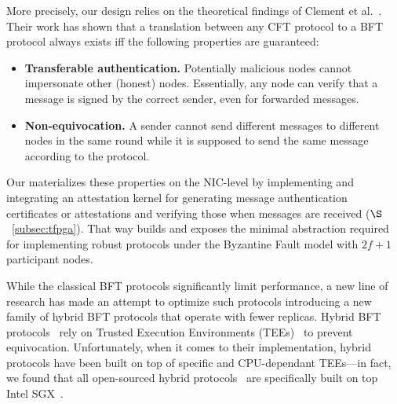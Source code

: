 More precisely, our design relies on the theoretical findings of Clement et al.~\cite{clement2012}. Their work has shown that a translation between any CFT protocol to a BFT protocol always exists iff the following properties are guaranteed:
\begin{itemize}
    \item {\bf{Transferable authentication.}} Potentially malicious nodes cannot impersonate other (honest) nodes. Essentially, any node can verify that a message is signed by the correct sender, even for forwarded messages.
    \item {\bf{Non-equivocation.}} A sender cannot send different messages to different nodes in the same round while it is supposed to send the same message according to the protocol.
\end{itemize}

Our \projecttitle{} materializes these properties on the NIC-level by implementing and integrating an attestation kernel for generating message authentication certificates or attestations and verifying those when messages are received ($\S$~\ref{subsec:tfpga}). That way \projecttitle{} builds and exposes the minimal abstraction required for implementing robust protocols under the Byzantine Fault model with $2f+1$ participant nodes.

 While the classical BFT protocols significantly limit performance, a new line of research has made an attempt to optimize such protocols introducing a new family of hybrid BFT protocols that operate with fewer replicas. Hybrid BFT protocols~\cite{10.1145/3492321.3519568, minBFT, hybster, 10.1145/2168836.2168866, DBLP:journals/corr/LiuLKA16a, trinc} rely on Trusted Execution Environments (TEEs)~\cite{cryptoeprint:2016:086, arm-realm, amd-sev, riscv-multizone, intelTDX}  to prevent equivocation.  Unfortunately, when it comes to their implementation, hybrid protocols have been built on top of specific and CPU-dependant TEEs---in fact, we found that all open-sourced hybrid protocols~\cite{hybster, 10.1145/3492321.3519568, minBFT, DBLP:journals/corr/LiuLKA16a} are specifically built on top Intel SGX~\cite{intel-sgx}.

